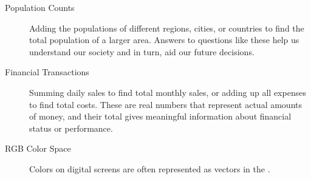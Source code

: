 \documentclass{ximera}
\begin{document}
\begin{concept}
\begin{description}
\item[Population Counts] Adding the populations of different regions,
  cities, or countries to find the total population of a larger
  area. Answers to questions like these help us understand our
  society and in turn, aid our future decisions.
\item[Financial Transactions] Summing daily sales to find total
  monthly sales, or adding up all expenses to find total costs. These
  are real numbers that represent actual amounts of money, and their
  total gives meaningful information about financial status or
  performance.
\item[RGB Color Space] Colors on digital screens are often represented
  as vectors in the .
  \begin{center}
\end{center}
\end{description}
\end{concept}
\end{document}

